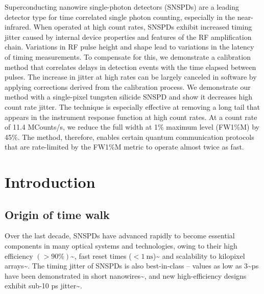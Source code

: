 \documentclass[11pt]{caltech_thesis} %
\begin{document}
Superconducting nanowire single-photon detectors (SNSPDs) are a leading
detector type for time correlated single photon counting, especially in
the near-infrared. When operated at high count rates, SNSPDs exhibit
increased timing jitter caused by internal device properties and
features of the RF amplification chain. Variations in RF pulse height
and shape lead to variations in the latency of timing measurements. To
compensate for this, we demonstrate a calibration method that correlates
delays in detection events with the time elapsed between pulses. The
increase in jitter at high rates can be largely canceled in software by
applying corrections derived from the calibration process. We
demonstrate our method with a single-pixel tungsten silicide SNSPD and
show it decreases high count rate jitter. The technique is especially
effective at removing a long tail that appears in the instrument
response function at high count rates. At a count rate of 11.4
MCounts/s, we reduce the full width at 1\% maximum level (FW1\%M) by
45\%. The method, therefore, enables certain quantum communication
protocols that are rate-limited by the FW1\%M metric to operate almost
twice as fast.

\hypertarget{introduction-1}{%
\section{Introduction}\label{introduction-1}}

\hypertarget{origin-of-time-walk}{%
\subsection{Origin of time walk}\label{origin-of-time-walk}}

Over the last decade, SNSPDs have advanced rapidly to become essential
components in many optical systems and technologies, owing to their high
efficiency
$(>90\%)$\textasciitilde{}\autocite{99.5_Chang_2021,reddy2020superconducting},
fast reset times
($< 1~\mathrm{ns}$)\textasciitilde{}\autocite{Vetter2016Cavity} and
scalability to kilopixel
arrays\textasciitilde{}\autocite{WollWollman2019}. The timing jitter of
SNSPDs is also best-in-class -- values as low as 3\textasciitilde ps
have been demonstrated in short
nanowires\textasciitilde{}\autocite{Korzh2020}, and new high-efficiency
designs exhibit sub-10 ps
jitter\textasciitilde{}\autocite{EsmaeilZadeh2020,Colangelo2021}.
\end{document}
